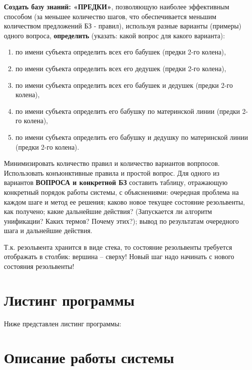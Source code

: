 \Large \textbf{Создать базу знаний: «ПРЕДКИ»}, позволяющую наиболее эффективным способом (за меньшее количество шагов, что обеспечивается меньшим количеством предложений БЗ - правил), используя разные варианты (примеры) одного вопроса, \textbf{определить} (указать: какой вопрос для какого варианта):
\begin{enumerate}
	\item по имени субъекта определить всех его бабушек (предки 2-го колена),
	\item по имени субъекта определить всех его дедушек (предки 2-го колена),
	\item по имени субъекта определить всех его бабушек и дедушек (предки 2-го колена),
	\item по имени субъекта определить его бабушку по материнской линии (предки 2-го колена),
	\item по имени субъекта определить его бабушку и дедушку по материнской линии (предки 2-го колена).
\end{enumerate}
	
Минимизировать количество правил и количество вариантов вопрпосов. Использовать конъюнктивные правила и простой вопрос.
Для одного из вариантов \textbf{ВОПРОСА и конкретной БЗ} составить таблицу, отражающую конкретный порядок работы системы, с объяснениями: 
очередная проблема на каждом шаге и метод ее решения; 
каково новое текущее состояние резольвенты, как получено;
какие дальнейшие действия? (Запускается ли алгоритм унификации? Каких термов? Почему этих?); вывод по результатам очередного шага и дальнейшие действия.

Т.к. резольвента хранится в виде стека, то состояние резольвенты требуется отображать в столбик: вершина – сверху! Новый шаг надо начинать с нового состояния резольвенты!


\newpage
\section*{Листинг программы}
Ниже представлен листинг программы:


\section*{Описание работы системы}


